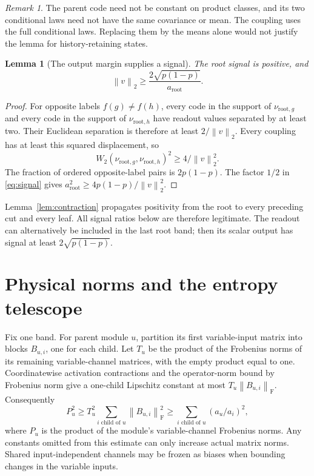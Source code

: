 \documentclass[11pt]{article}
\newtheorem{lemma}[theorem]{Lemma}
\theoremstyle{remark}\newtheorem{remark}[theorem]{Remark}
\newcommand{\norm}[1]{\left\lVert#1\right\rVert}
\newcommand{\W}{W_2}
\begin{document}
\begin{remark}
The parent code need not be constant on product classes, and its two
conditional laws need not have the same covariance or mean. The coupling
uses the full conditional laws. Replacing them by the means alone would
not justify the lemma for history-retaining states.
\end{remark}

\begin{lemma}[The output margin supplies a signal]\label{lem:root}
The root signal is positive, and
\[
 \norm v_2\ge\frac{2\sqrt{p(1-p)}}{a_{\mathrm{root}}}.
\]
\end{lemma}
\begin{proof}
For opposite labels $f(g)\ne f(h)$, every code in the support of
$\nu_{\mathrm{root},g}$ and every code in the support of
$\nu_{\mathrm{root},h}$ have readout values separated by at least two.
Their Euclidean separation is therefore at least $2/\norm v_2$. Every
coupling has at least this squared displacement, so
\[
 \W(\nu_{\mathrm{root},g},\nu_{\mathrm{root},h})^2
       \ge4/\norm v_2^2.
\]
The fraction of ordered opposite-label pairs is $2p(1-p)$. The factor
$1/2$ in \eqref{eq:signal} gives
$a_{\mathrm{root}}^2\ge4p(1-p)/\norm v_2^2$.
\end{proof}

Lemma~\ref{lem:contraction} propagates positivity from the root to every
preceding cut and every leaf. All signal ratios below are therefore legitimate.
The readout can alternatively be included in the last root band; then its
scalar output has signal at least $2\sqrt{p(1-p)}$.

\section{Physical norms and the entropy telescope}

Fix one band. For parent module $u$, partition its first variable-input
matrix into blocks $B_{u,i}$, one for each child. Let $T_u$ be the product of
the Frobenius norms of its remaining variable-channel matrices, with the
empty product equal to one. Coordinatewise activation contractions and the
operator-norm bound by Frobenius norm give a one-child Lipschitz constant
at most $T_u\norm{B_{u,i}}_{\mathrm F}$. Consequently
\begin{equation}\label{eq:module}
 P_u^2\ge T_u^2\sum_{i\text{ child of }u}
                   \norm{B_{u,i}}_{\mathrm F}^2
       \ge\sum_{i\text{ child of }u}(a_u/a_i)^2,
\end{equation}
where $P_u$ is the product of the module's variable-channel Frobenius norms.
Any constants omitted from this estimate can only increase actual matrix
norms. Shared input-independent channels may be frozen as biases when
bounding changes in the variable inputs.
\end{document}
